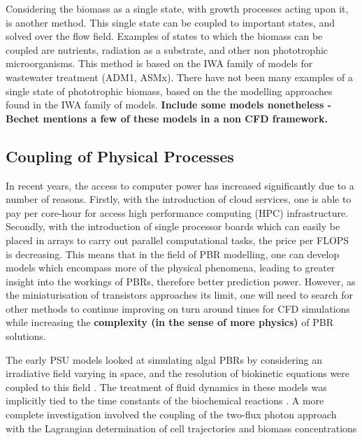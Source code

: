 Considering the biomass as a single state, with growth processes acting upon it, is another method. This single state can be coupled to important states, and solved over the flow field. Examples of states to which the biomass can be coupled are nutrients, radiation as a substrate, and other non phototrophic microorganisms. This method is based on the IWA family of models for wastewater treatment (ADM1, ASMx). There have not been many examples of a single state of phototrophic biomass, based on the the modelling approaches found in the IWA family of models. \textbf{Include some models nonetheless - Bechet mentions a few of these models in a non CFD framework.}


\subsection{Coupling of Physical Processes}
\label{S:2.6}
In recent years, the access to computer power has increased significantly due to a number of reasons. Firstly, with the introduction of cloud services, one is able to pay per core-hour for access high performance computing (HPC) infrastructure. Secondly, with the introduction of single processor boards which can easily be placed in arrays to carry out parallel computational tasks, the price per FLOPS is decreasing. This means that in the field of PBR modelling, one can develop models which encompass more of the physical phenomena, leading to greater insight into the workings of PBRs, therefore better prediction power. However, as the miniaturisation of transistors approaches its limit, one will need to search for other methods to continue improving on turn around times for CFD simulations while increasing the \textbf{complexity (in the sense of more physics)} of PBR solutions. 


The early PSU models looked at simulating algal PBRs by considering an irradiative field varying in space, and the resolution of biokinetic equations were coupled to this field \cite{Wu2001,Wu2002,Merchuk2003a,Merchuk2007}. The treatment of fluid dynamics in these models was implicitly tied to the time constants of the biochemical reactions \cite{Merchuk2007}. A more complete investigation involved the coupling of the two-flux photon approach with the Lagrangian determination of cell trajectories and biomass concentrations \cite{Pruvost2008}

